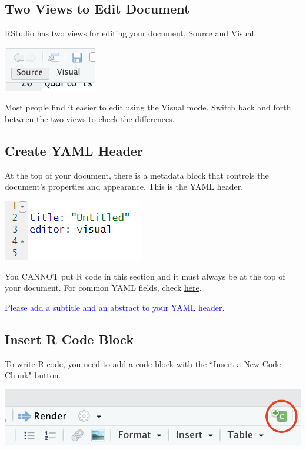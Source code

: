 \documentclass[12pt]{article}
\begin{document}
\subsection{Two Views to Edit Document}
RStudio has two views for editing your document, Source and Visual. 
\begin{center}
   \includegraphics[scale=.8]{editmode.png} 
\end{center}
Most people find it easier to edit using the Visual mode. Switch back and forth between the
two views to check the differences.

\subsection{Create YAML Header}
At the top of your document, there is a metadata block that controls the document's properties and appearance. This is the YAML header.

\begin{center}
   \includegraphics[scale=.8]{yamlblock.png} 
\end{center}

You CANNOT put R code in this section and it must always be at the top of your document.
For common YAML fields, check \href{https://quarto.org/docs/reference/formats/html.html}{here}. 

\textcolor{blue}{Please add a subtitle and an abstract to your YAML header.}


\subsection{Insert R Code Block}
To write R code, you need to add a code block with the ``Insert a New Code Chunk" button.
\begin{center}
    \includegraphics[scale=.8]{Insert code block.png}
\end{center}
\end{document}
